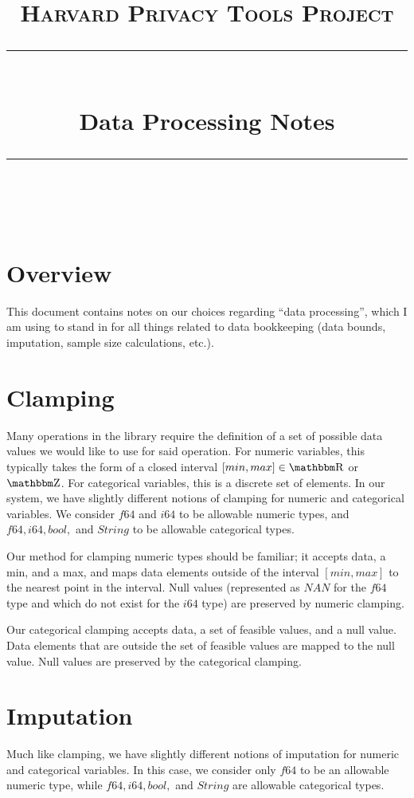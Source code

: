 \documentclass[11pt]{scrartcl} %
\title{
	\normalfont\normalsize
	\textsc{Harvard Privacy Tools Project}\\ %
	\vspace{25pt} %
	\rule{\linewidth}{0.5pt}\\ %
	\vspace{20pt} %
	{\huge Data Processing Notes}\\ %
	\vspace{12pt} %
	\rule{\linewidth}{2pt}\\ %
	\vspace{12pt} %
}
\author{} %
\date{} %
\begin{document}
\maketitle

\section{Overview}
This document contains notes on our choices regarding ``data processing'', which I am using to stand in
for all things related to data bookkeeping (data bounds, imputation, sample size calculations, etc.).

\section{Clamping}
Many operations in the library require the definition of a set of possible data values
we would like to use for said operation. For numeric variables, this typically
takes the form of a closed interval $[min, max] \in \R$ or $\Z$. For categorical
variables, this is a discrete set of elements.
In our system, we have slightly different notions of clamping for numeric and categorical variables.
We consider $f64$ and $i64$ to be allowable numeric types, and $f64, i64, bool,$ and $String$ to be
allowable categorical types. \newline

Our method for clamping numeric types should be familiar; it accepts data, a min, and a max,
and maps data elements outside of the interval $[min, max]$ to the nearest point in the interval.
Null values (represented as $NAN$ for the $f64$ type and which do not exist for the $i64$ type)
are preserved by numeric clamping. \newline

Our categorical clamping accepts data, a set of feasible values, and a null value.
Data elements that are outside the set of feasible values are mapped to the null value.
Null values are preserved by the categorical clamping. \newline

\section{Imputation}
Much like clamping, we have slightly different notions of imputation for numeric and categorical variables.
In this case, we consider only $f64$ to be an allowable numeric type, while
$f64, i64, bool,$ and $String$ are allowable categorical types. \newline
\end{document}
